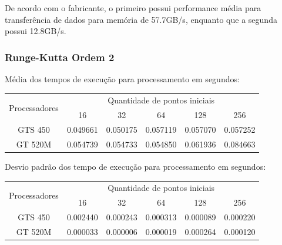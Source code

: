   De acordo com o fabricante, o primeiro possui performance média para transferência de dados para memória de 57.7GB/s, enquanto que a segunda possui 12.8GB/s.
    \subsubsection{Runge-Kutta Ordem 2}
    Média dos tempos de execução para processamento em segundos:\\
    \begin{scriptsize}
    \begin{tabular}{| c | c | c | c | c | c |}
      \hline
      \multirow{2}{*}{Processadores}& \multicolumn{5}{|c|}{Quantidade de pontos iniciais} \\ \cline{2-6}
      & 16 & 32 & 64 & 128 & 256 \\ \hline
      GTS 450 & 0.049661 & 0.050175 & 0.057119 & 0.057070 & 0.057252 \\ \hline
      GT 520M & 0.054739 & 0.054733 & 0.054850 & 0.061936 & 0.084663 \\ \hline

      \hline
    \end{tabular}
    \end{scriptsize}
    
    \hspace{1mm}\newline
    
    \noindent Desvio padrão dos tempo de execução para processamento em segundos:\\
    \begin{scriptsize}
    \begin{tabular}{| c | c | c | c | c | c |}
      \hline
      \multirow{2}{*}{Processadores}& \multicolumn{5}{|c|}{Quantidade de pontos iniciais} \\ \cline{2-6}
      & 16 & 32 & 64 & 128 & 256 \\ \hline
      GTS 450 & 0.002440 & 0.000243 & 0.000313 & 0.000089 & 0.000220 \\ \hline
      GT 520M & 0.000033 & 0.000006 & 0.000019 & 0.000264 & 0.000120 \\ \hline

      \hline
    \end{tabular}
    \end{scriptsize}
    
    \hspace{1mm}\newline
    
